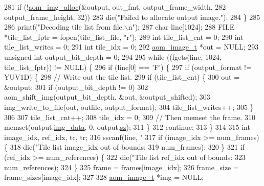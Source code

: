\begin{DoxyCodeInclude}
{{{{{{{281     \textcolor{keywordflow}{if} (!\hyperlink{aom__image_8h_a570db29fbd122951235a08fe9375f6bb}{aom\_img\_alloc}(&output, out\_fmt, output\_frame\_width,
282                        output\_frame\_height, 32))
283       die(\textcolor{stringliteral}{"Failed to allocate output image."});
284   \}
285 
286   printf(\textcolor{stringliteral}{"Decoding tile list from file.\(\backslash\)n"});
287   \textcolor{keywordtype}{char} line[1024];
288   FILE *tile\_list\_fptr = fopen(tile\_list\_file, \textcolor{stringliteral}{"r"});
289   \textcolor{keywordtype}{int} tile\_list\_cnt = 0;
290   \textcolor{keywordtype}{int} tile\_list\_writes = 0;
291   \textcolor{keywordtype}{int} tile\_idx = 0;
292   \hyperlink{structaom__image}{aom\_image\_t} *out = NULL;
293   \textcolor{keywordtype}{unsigned} \textcolor{keywordtype}{int} output\_bit\_depth = 0;
294 
295   \textcolor{keywordflow}{while} ((fgets(line, 1024, tile\_list\_fptr)) != NULL) \{
296     \textcolor{keywordflow}{if} (line[0] == \textcolor{charliteral}{'F'}) \{
297       \textcolor{keywordflow}{if} (output\_format != YUV1D) \{
298         \textcolor{comment}{// Write out the tile list.}
299         \textcolor{keywordflow}{if} (tile\_list\_cnt) \{
300           out = &output;
301           \textcolor{keywordflow}{if} (output\_bit\_depth != 0)
302             aom\_shift\_img(output\_bit\_depth, &out, &output\_shifted);
303           img\_write\_to\_file(out, outfile, output\_format);
304           tile\_list\_writes++;
305         \}
306 
307         tile\_list\_cnt++;
308         tile\_idx = 0;
309         \textcolor{comment}{// Then memset the frame.}
310         memset(output.\hyperlink{structaom__image_a7c367f3227d5876ce9e5c198a01c2028}{img\_data}, 0, output.\hyperlink{structaom__image_af0f6c220bf000d1c488075c19d889290}{sz});
311       \}
312       \textcolor{keywordflow}{continue};
313     \}
314 
315     \textcolor{keywordtype}{int} image\_idx, ref\_idx, tc, tr;
316     sscanf(line, \textcolor{stringliteral}{"%
317     \textcolor{keywordflow}{if} (image\_idx >= num\_frames) \{
318       die(\textcolor{stringliteral}{"Tile list image\_idx out of bounds: %
319           num\_frames);
320     \}
321     \textcolor{keywordflow}{if} (ref\_idx >= num\_references) \{
322       die(\textcolor{stringliteral}{"Tile list ref\_idx out of bounds: %
323           num\_references);
324     \}
325     frame = frames[image\_idx];
326     frame\_size = frame\_sizes[image\_idx];
327 
328     \hyperlink{structaom__image}{aom\_image\_t} *img = NULL;
}}}}}}}}}}
\end{DoxyCodeInclude}
